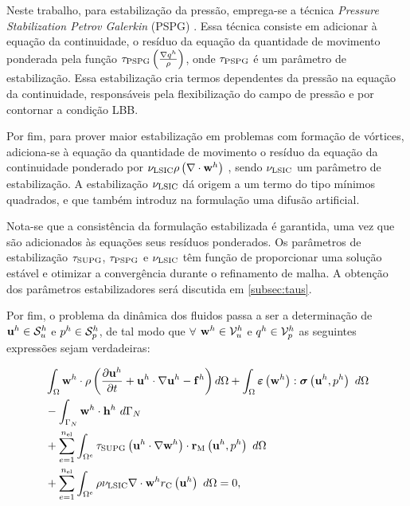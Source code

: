\documentclass[tese_patricia]{subfiles}%
\begin{document}
Neste trabalho, para estabilização da pressão, emprega-se a técnica \textit{Pressure Stabilization Petrov Galerkin} (PSPG)   \cite{HughesFB:1986,TezduyarMRS:1992a}. Essa técnica consiste em adicionar à equação da continuidade, o resíduo da equação da quantidade de movimento ponderada pela função $\tau_{\mathrm{PSPG}} \left(\frac{\nabla q^h}{\rho}\right)$, onde $\tau_{\mathrm{PSPG}}$ é um parâmetro de estabilização. Essa estabilização cria termos dependentes da pressão na equação da continuidade, responsáveis pela flexibilização do campo de pressão e por contornar a condição LBB.

Por fim, para prover maior estabilização em problemas com formação de vórtices, adiciona-se à equação da quantidade de movimento o resíduo da equação da continuidade ponderado por $ \nu_{\mathrm{LSIC}} \rho \left(\nabla \cdot \mathbf{w}^h\right)$ \cite{TezduyarO:2000}, sendo $\nu_{\mathrm{LSIC}}$ um parâmetro de estabilização. A estabilização  $\nu_{\mathrm{LSIC}}$ dá origem a um termo do tipo mínimos quadrados, e que também introduz na formulação uma difusão artificial.

Nota-se que a consistência da formulação estabilizada é garantida, uma vez que são adicionados às equações seus resíduos ponderados. Os parâmetros de estabilização $\tau_{\mathrm{SUPG}}$, $\tau_{\mathrm{PSPG}}$ e $\nu_{\mathrm{LSIC}}$ têm função de proporcionar uma solução estável e otimizar a convergência durante o refinamento de malha. A obtenção dos parâmetros estabilizadores será discutida em \ref{subsec:taus}. 

Por fim, o problema da dinâmica dos fluidos passa a ser a determinação de $\mathbf{u}^h \in \mathcal{S}_u^h$ e $p^h \in \mathcal{S}_p^h$, de tal modo que $\forall$ $\mathbf{w}^h \in \mathcal{V}_u^h$ e $q^h \in \mathcal{V}_p^h$ as seguintes expressões sejam verdadeiras:

\begin{align}
\begin{split}
&\int_{\Omega} \mathbf{w}^h \cdot \rho\left(\frac{\partial\mathbf{u}^h}{\partial t}+\mathbf{u}^h\cdot \nabla\mathbf{u}^h - \mathbf{f}^h\right) d\Omega +\int_{\Omega} \bm{\varepsilon} \left(\mathbf{w}^h\right) : \boldsymbol{\sigma} \left(\mathbf{u}^h,p^h\right)\ d\Omega\\ &
- \int_{\Gamma_N}\mathbf{w}^h \cdot \mathbf{h}^h\ d\Gamma_N \\ 
&+ \sum_{e=1}^{n_{\mathrm{el}}} \int_{\Omega^e} \tau_{\mathrm{SUPG}} \left(\mathbf{u}^h \cdot \nabla\mathbf{w}^h\right) \cdot \mathbf{r}_{\mathrm{M}}\left(\mathbf{u}^h,p^h \right)\  d\Omega\\
&+ \sum_{e=1}^{n_{\mathrm{el}}} \int_{\Omega^e} \rho \nu_{\mathrm{LSIC}} \nabla \cdot \mathbf{w}^h {r}_{\mathrm{C}}\left(\mathbf{u}^h\right)\  d\Omega = 0,
\label{eq:FinalSystem}
\end{split}
\end{align}
\end{document}
